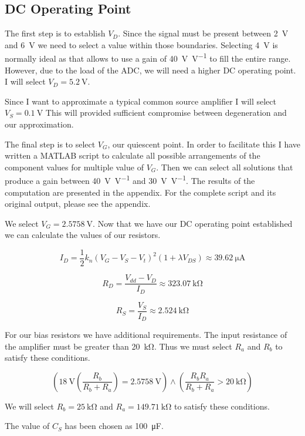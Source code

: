 \documentclass[journal]{IEEEtran}
\begin{document}
\subsection{DC Operating Point}
The first step is to establish $V_D$. Since the signal must be present between \SI{2}{\volt} and \SI{6}{\volt} we need to select a value within those boundaries. Selecting \SI{4}{\volt} is normally ideal as that allows to use a gain of \SI[per-mode=symbol]{40}{\volt\per\volt} to fill the entire range. However, due to the load of the ADC, we will need a higher DC operating point. I will select $V_D = \SI{5.2}{\volt}$.

Since I want to approximate a typical common source amplifier I will select $V_S = \SI{0.1}{\volt}$ This will provided sufficient compromise between degeneration and our approximation.

The final step is to select $V_G$, our quiescent point. In order to facilitate this I have written a MATLAB script to calculate all possible arrangements of the component values for multiple value of $V_G$. Then we can select all solutions that produce a gain between \SI[per-mode=symbol]{40}{\volt\per\volt} and \SI[per-mode=symbol]{30}{\volt\per\volt}. The results of the computation are presented in the appendix. For the complete script and its original output, please see the appendix.

We select $V_G = \SI{2.5758}{\volt}$. Now that we have our DC operating point established we can calculate the values of our resistors.

$$ I_D = \frac{1}{2} k_n (V_G - V_S - V_t)^2 (1 + \lambda V_{DS}) \approx \SI{39.62}{\micro\ampere} $$

$$ R_D = \frac{V_{dd} - V_D}{I_D} \approx \SI{323.07}{\kilo\ohm} $$

$$ R_S = \frac{V_S}{I_D} \approx \SI{2.524}{\kilo\ohm} $$

For our bias resistors we have additional requirements. The input resistance of the amplifier must be greater than \SI{20}{\kilo\ohm}. Thus we must select $R_a$ and $R_b$ to satisfy these conditions.

$$ \left( \SI{18}{\volt} \left( \frac{R_b}{R_b + R_a} \right) = \SI{2.5758}{\volt} \right) \land \left( \frac{R_b R_a}{R_b + R_a} > \SI{20}{\kilo\ohm} \right) $$

We will select $R_b = \SI{25}{\kilo\ohm}$ and $R_a = \SI{149.71}{\kilo\ohm}$ to satisfy these conditions.

The value of $C_S$ has been chosen as \SI{100}{\micro\farad}.
\end{document}
